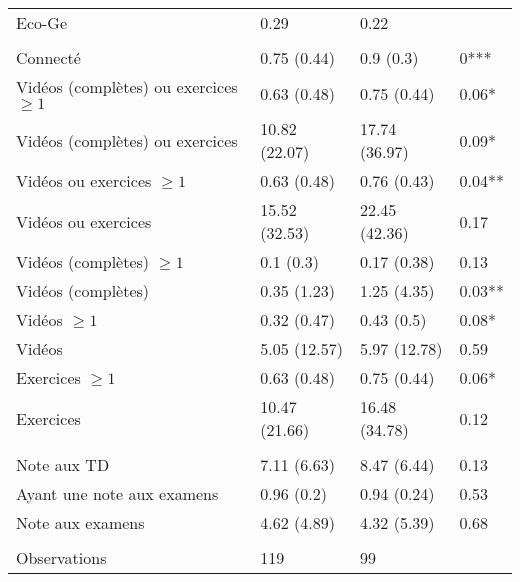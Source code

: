 \documentclass[
]{book}
\begin{document}
\begin{ThreePartTable}
\begin{longtable}[t]{llll}
\hspace{1em}Eco-Ge & 0.29 & 0.22 & \\
\addlinespace[0.3em]
\multicolumn{4}{l}{\textbf{Plateforme}}\\
\hspace{1em}Connecté & 0.75 (0.44) & 0.9 (0.3) & 0***\\
\hspace{1em}Vidéos (complètes) ou exercices $\geq 1$ & 0.63 (0.48) & 0.75 (0.44) & 0.06*\\
\hspace{1em}Vidéos (complètes) ou exercices & 10.82 (22.07) & 17.74 (36.97) & 0.09*\\
\hspace{1em}Vidéos ou exercices $\geq 1$ & 0.63 (0.48) & 0.76 (0.43) & 0.04**\\
\hspace{1em}Vidéos ou exercices & 15.52 (32.53) & 22.45 (42.36) & 0.17\\
\hspace{1em}Vidéos (complètes) $\geq 1$ & 0.1 (0.3) & 0.17 (0.38) & 0.13\\
\hspace{1em}Vidéos (complètes) & 0.35 (1.23) & 1.25 (4.35) & 0.03**\\
\hspace{1em}Vidéos $\geq 1$ & 0.32 (0.47) & 0.43 (0.5) & 0.08*\\
\hspace{1em}Vidéos & 5.05 (12.57) & 5.97 (12.78) & 0.59\\
\hspace{1em}Exercices $\geq 1$ & 0.63 (0.48) & 0.75 (0.44) & 0.06*\\
\hspace{1em}Exercices & 10.47 (21.66) & 16.48 (34.78) & 0.12\\
\addlinespace[0.3em]
\multicolumn{4}{l}{\textbf{Résultats}}\\
\hspace{1em}Note aux TD & 7.11 (6.63) & 8.47 (6.44) & 0.13\\
\hspace{1em}Ayant une note aux examens & 0.96 (0.2) & 0.94 (0.24) & 0.53\\
\hspace{1em}Note aux examens & 4.62 (4.89) & 4.32 (5.39) & 0.68\\
\addlinespace[0.3em]
\multicolumn{4}{l}{\textbf{ }}\\
\hspace{1em}Observations & 119 & 99 & \\*
\end{longtable}
\end{ThreePartTable}
\endgroup{}
\end{document}

